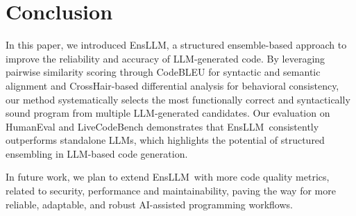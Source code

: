 \documentclass{article}
\newcommand{\tool}{EnsLLM}
\begin{document}
\section{Conclusion}

In this paper, we introduced \tool, a structured ensemble-based approach to improve the reliability and accuracy of LLM-generated code. By leveraging pairwise similarity scoring through CodeBLEU for syntactic and semantic alignment and CrossHair-based differential analysis for behavioral consistency, our method systematically selects the most functionally correct and syntactically sound program from multiple LLM-generated candidates. Our evaluation on HumanEval and LiveCodeBench demonstrates that \tool\ consistently outperforms standalone LLMs, which highlights the potential of structured ensembling in LLM-based code generation.

In future work, we plan to extend \tool\  with more code quality metrics, related to  security, performance and maintainability, paving the way for more reliable, adaptable, and robust AI-assisted programming workflows. 



\end{document}
